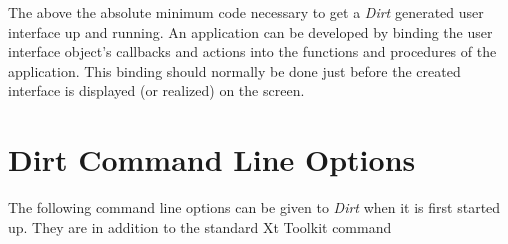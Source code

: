 The above the absolute minimum code necessary to get a {\em Dirt} 
generated user interface up and running.  An application can be 
developed by binding the user interface object's callbacks and actions 
into the functions and procedures of the application.  This binding 
should normally be done just before the created interface is displayed 
(or realized) on the screen.



\appendix
\newpage{}
\section{Dirt Command Line Options}
\label{appendix:command-line-args}
The following command line options can be given to {\em Dirt} when it is
first started up.  They are in addition to the standard Xt Toolkit command
